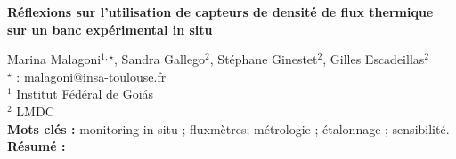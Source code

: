


    \newpage


%
\begin{flushleft}
\addtocounter{section}{1}
{\Large \textbf{Réflexions sur l'utilisation de capteurs de densité de flux thermique sur un banc expérimental in situ}}\label{ref:15}
\end{flushleft}
%
Marina Malagoni$^{1,\star}$, Sandra Gallego$^{2}$, Stéphane Ginestet$^{2}$, Gilles Escadeillas$^{2}$\\[2mm]
$^{\star}$ \Letter : \url{malagoni@insa-toulouse.fr}\\[2mm]
{\footnotesize $^{1}$ Institut Fédéral de Goiás}\\
{\footnotesize $^{2}$ LMDC}\\
[4mm]
%
\noindent \textbf{Mots clés : } monitoring in-situ ; fluxmètres; métrologie ; étalonnage ; sensibilité.\\[4mm]
%
\noindent \textbf{Résumé : } 

